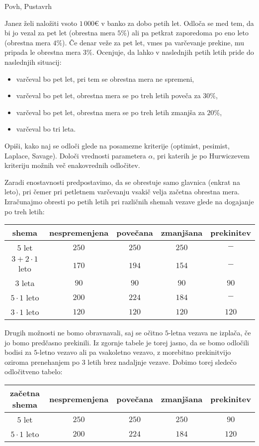 \begin{naloga}{Povh, Pustavrh}{\cite[Naloga~6.9]{pp}}
\begin{vprasanje}
Janez želi naložiti vsoto $1\,000 €$ v banko za dobo petih let.
Odloča se med tem, da bi jo vezal za pet let (obrestna mera $5\%$)
ali pa petkrat zaporedoma po eno leto (obrestna mera $4\%$).
Če denar veže za pet let, vmes pa varčevanje prekine,
mu pripada le obrestna mera $3\%$.
Ocenjuje, da lahko v naslednjih petih letih pride do naslednjih situacij:
\begin{itemize}
\item varčeval bo pet let, pri tem se obrestna mera ne spremeni,
\item varčeval bo pet let, obrestna mera se po treh letih poveča za $30\%$,
\item varčeval bo pet let, obrestna mera se po treh letih zmanjša za $20\%$,
\item varčeval bo tri leta.
\end{itemize}
Opiši, kako naj se odloči glede na posamezne kriterije
(optimist, pesimist, Laplace, Savage).
Določi vrednosti parametera $\alpha$,
pri katerih je po Hurwiczevem kriteriju možnih več enakovrednih odločitev.
\end{vprasanje}

\begin{odgovor}
Zaradi enostavnosti predpostavimo,
da se obrestuje samo glavnica (enkrat na leto),
pri čemer pri petletnem varčevanju vsakič velja začetna obrestna mera.
Izračunajmo obresti po petih letih pri različnih shemah vezave
glede na dogajanje po treh letih:
\begin{center}
\begin{tabular}{c|cccc}
shema & nespremenjena & povečana & zmanjšana & prekinitev \\ \hline
$5$ let              & $250$ & $250$ & $250$ &   $-$ \\
$3 + 2 \cdot 1$ leto & $170$ & $194$ & $154$ &   $-$ \\
$3$ leta             &  $90$ &  $90$ &  $90$ &  $90$ \\ \hline
$5 \cdot 1$ leto     & $200$ & $224$ & $184$ &   $-$ \\
$3 \cdot 1$ leto     & $120$ & $120$ & $120$ & $120$ \\
\end{tabular}
\end{center}
Drugih možnosti ne bomo obravnavali,
saj se očitno $5$-letna vezava ne izplača, če jo bomo predčasno prekinili.
Iz zgornje tabele je torej jasno,
da se bomo odločili bodisi za $5$-letno vezavo ali pa vsakoletno vezavo,
z morebitno prekinitvijo oziroma prenehanjem po $3$ letih
brez nadaljnje vezave.
Dobimo torej sledečo odločitveno tabelo:
\begin{center}
\begin{tabular}{c|cccc}
začetna shema & nespremenjena & povečana & zmanjšana & prekinitev \\ \hline
$5$ let          & $250$ & $250$ & $250$ &  $90$ \\
$5 \cdot 1$ leto & $200$ & $224$ & $184$ & $120$ \\
\end{tabular}
\end{center}


\end{odgovor}
\end{naloga}
